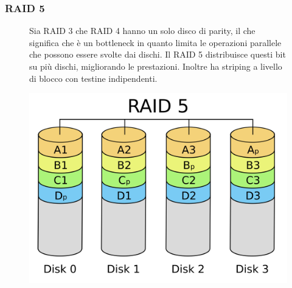 \subsubsection*{RAID 5}
\begin{figure}[H]
    \centering
    \begin{minipage}{0.65\textwidth}
        Sia RAID 3 che RAID 4 hanno un solo disco di parity, il che significa che è un bottleneck in quanto limita le operazioni parallele che possono essere svolte dai dischi. Il RAID 5 distribuisce questi bit su più dischi, migliorando le prestazioni. Inoltre ha striping a livello di blocco con testine indipendenti.
    \end{minipage}
    \hfill
    \begin{minipage}{0.3\textwidth}
        \centering
        \includegraphics[width=1\linewidth]{assets/RAID_5.png}
    \end{minipage}
\end{figure}

